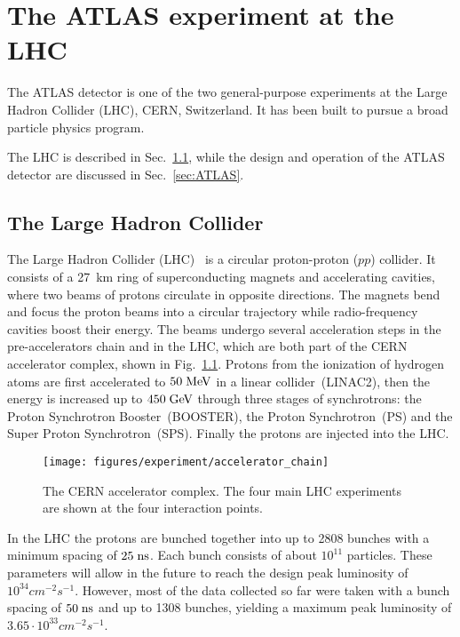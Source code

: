 \chapter{The ATLAS experiment at the LHC}
\label{sec:experiment}

The ATLAS detector is one of the two general-purpose experiments 
at the Large Hadron Collider (LHC), CERN, Switzerland.
It has been built to pursue a broad particle physics program. 

The LHC is described in Sec.~\ref{sec:LHC}, while the design and operation of the 
ATLAS detector are discussed in Sec.~\ref{sec:ATLAS}.

\section{The Large Hadron Collider}
\label{sec:LHC}

The Large Hadron Collider (LHC)~\cite{LHCreport} 
is a circular proton-proton ($pp$) collider.
It consists of a 27~km ring of superconducting magnets and
accelerating cavities, where two beams of protons circulate in
opposite directions.
The magnets bend and focus the proton beams into a circular trajectory while radio-frequency
cavities boost their energy.
The beams undergo several acceleration steps in the pre-accelerators chain
and in the LHC, which are both part of the CERN accelerator complex, shown in Fig.~\ref{fig:lhc}.
Protons from the ionization of hydrogen atoms are first accelerated to \mbox{$50 \; \mathrm{MeV}$}
in a linear collider~(LINAC2), then the energy is increased up to
\mbox{$450 \; \mathrm{GeV}$} through three stages of synchrotrons: the Proton
Synchrotron Booster~(BOOSTER), the Proton Synchrotron~(PS) and the Super Proton Synchrotron~(SPS).
Finally the protons are injected into the LHC.

\begin{figure}[ht]
\begin{center}
\texttt{[image: figures/experiment/accelerator\_chain]}
\caption[CERN Accelerator complex]{
  The CERN accelerator complex. The four main LHC experiments are
  shown at the four interaction points.}
\label{fig:lhc}
\end{center}
\end{figure}

In the LHC the protons are bunched together into up to 2808 bunches 
with a minimum spacing of \mbox{$25 \; \mathrm{ns}$}. 
Each bunch consists of about $10^{11}$ particles. 
These parameters will allow in the future to reach 
the design peak luminosity of \mbox{$10^{34} cm^{-2}s^{-1}$}.
However, most of the data collected so far were taken with a bunch 
spacing of \mbox{$50 \; \mathrm{ns}$} and up to 1308 bunches, 
yielding a maximum peak luminosity of \mbox{$3.65\cdot{}10^{33} cm^{-2}s^{-1}$}.

